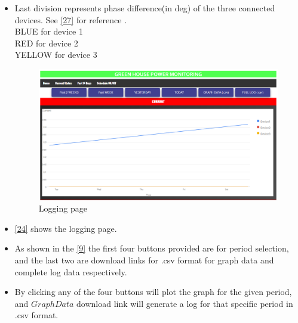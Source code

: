 \documentclass[a4paper,12pt,oneside]{book}
\begin{document}
\begin{itemize}
	\item{Last division represents phase difference(in deg) of the three connected devices. See  \autoref{27} for reference .\\BLUE for device 1\\RED for device 2\\YELLOW for device 3 } 
	
	\begin{figure}[H]
		\centering
		\includegraphics[width=15cm]{logging_page.png}
		\caption{Logging page}
		\label{24}
	\end{figure}
	
	
	\item{\autoref{24} shows the logging page.}
	\item{As shown in the \autoref{9} the first four buttons provided are for period selection, and the last two are download links for .csv format for graph data and complete log data respectively.   }
	
	\item{By clicking any of the four buttons will plot the graph for the given period, and $Graph Data$ download link will generate a log for that specific period in .csv format.}
	

\end{itemize}
\end{document}
